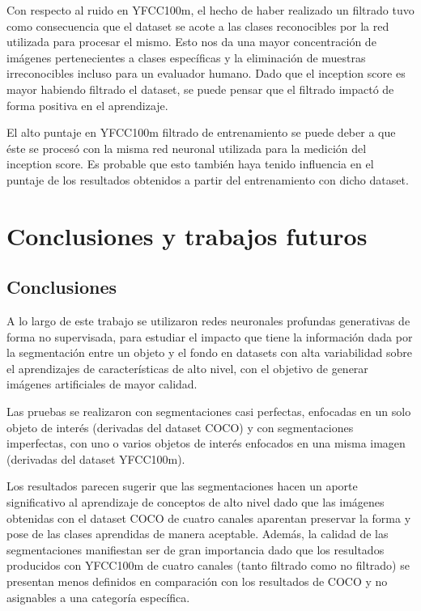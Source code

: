\documentclass[spanish]{report}
\begin{document}
Con respecto al ruido en YFCC100m, el hecho de haber realizado un filtrado tuvo como consecuencia que el dataset se acote a las clases reconocibles por la red utilizada para procesar el mismo. Esto nos da una mayor concentración de imágenes pertenecientes a clases específicas y la eliminación de muestras irreconocibles incluso para un evaluador humano. Dado que el inception score es mayor habiendo filtrado el dataset, se puede pensar que el filtrado impactó de forma positiva en el aprendizaje. 

El alto puntaje en YFCC100m filtrado de entrenamiento se puede deber a que éste se procesó con la misma red neuronal utilizada para la medición del inception score. Es probable que esto también haya tenido influencia en el puntaje de los resultados obtenidos a partir del entrenamiento con dicho dataset.


\chapter{Conclusiones y trabajos futuros}





\section{Conclusiones}

A lo largo de este trabajo se utilizaron redes neuronales profundas generativas de forma no supervisada, para estudiar el impacto que tiene la información dada por la segmentación entre un objeto y el fondo en datasets con alta variabilidad sobre el aprendizajes de características de alto nivel, con el objetivo de generar imágenes artificiales de mayor calidad.

Las pruebas se realizaron con segmentaciones casi perfectas, enfocadas en un solo objeto de interés (derivadas del dataset COCO) y con segmentaciones imperfectas, con uno o varios objetos de interés enfocados en una misma imagen (derivadas del dataset YFCC100m).

Los resultados parecen sugerir que las segmentaciones hacen un aporte significativo al aprendizaje de conceptos de alto nivel dado que las imágenes obtenidas con el dataset COCO de cuatro canales aparentan preservar la forma y pose de las clases aprendidas de manera aceptable. Además, la calidad de las segmentaciones manifiestan ser de gran importancia dado que los resultados producidos con YFCC100m de cuatro canales (tanto filtrado como no filtrado) se presentan menos definidos en comparación con los resultados de COCO y no asignables a una categoría específica.
\end{document}

